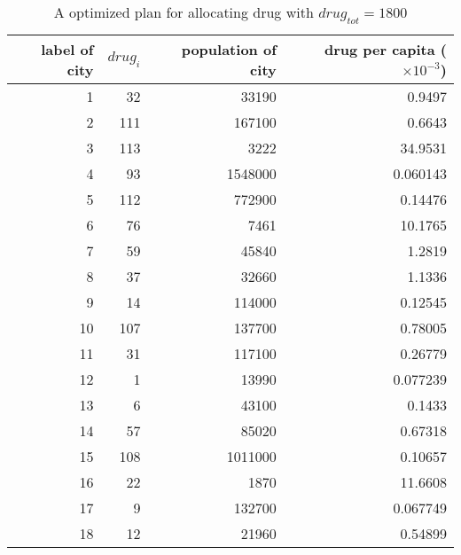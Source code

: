 \begin{table}[]
\centering
\begin{tabular}{|r|r|r|r|}
\hline
label of city&$drug_i$&population of city & drug per capita ($\times 10^{-3}$)\\ \hline
1&32&33190&0.9497\\ \hline
2&111&167100&0.6643\\ \hline
3&113&3222&34.9531\\ \hline
4&93&1548000&0.060143\\ \hline
5&112&772900&0.14476\\ \hline
6&76&7461&10.1765\\ \hline
7&59&45840&1.2819\\ \hline
8&37&32660&1.1336\\ \hline
9&14&114000&0.12545\\ \hline
10&107&137700&0.78005\\ \hline
11&31&117100&0.26779\\ \hline
12&1&13990&0.077239\\ \hline
13&6&43100&0.1433\\ \hline
14&57&85020&0.67318\\ \hline
15&108&1011000&0.10657\\ \hline
16&22&1870&11.6608\\ \hline
17&9&132700&0.067749\\ \hline
18&12&21960&0.54899\\ \hline
\end{tabular}
\caption{A optimized plan for allocating drug with $drug_{tot} = 1800$ }
\label{drug}
\end{table}
